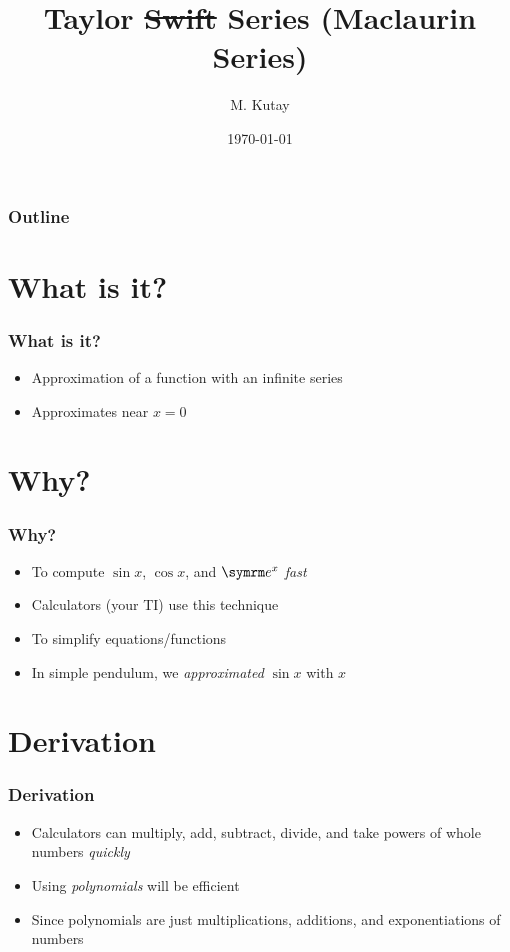\documentclass{beamer}
\title{Taylor \sout{Swift} Series (Maclaurin Series)}
\author{M. Kutay}
\institute{Made with \LaTeX}
\date{\today}
\begin{document}
\begin{frame}
  \titlepage
\end{frame}

\begin{frame}
  \frametitle{Outline}
  \tableofcontents
\end{frame}

\section{What is it?}

\begin{frame}
  \frametitle{What is it?}
  \begin{itemize}
    \item Approximation of a function with an infinite series
    \item Approximates near \( x = 0 \)
  \end{itemize}
\end{frame}

\section{Why?}

\begin{frame}
  \frametitle{Why?}
  \begin{itemize}
    \item To compute \( \sin x \), \( \cos x \), and \( \e^x \) \textit{fast}
    \item Calculators (your TI) use this technique
    \item To simplify equations/functions
    \item In simple pendulum, we \textit{approximated} \( \sin x \) with \( x \)
  \end{itemize}
\end{frame}

\section{Derivation}

\begin{frame}
  \frametitle{Derivation}
  \begin{itemize}
    \item Calculators can multiply, add, subtract, divide, and take powers of whole numbers \textit{quickly}
    \item Using \textit{polynomials} will be efficient
    \item Since polynomials are just multiplications, additions, and exponentiations of numbers
  \end{itemize}
\end{frame}
\end{document}
